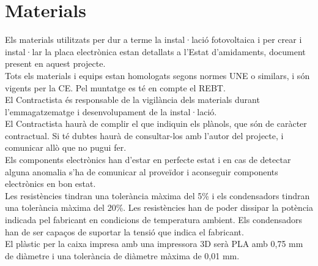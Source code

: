 \section{Materials}
Els materials utilitzats per dur a terme la instal·lació fotovoltaica i per crear i instal·lar la placa electrònica estan detallats a l'Estat d'amidaments, document present en aquest projecte.\\
\newline Tots els materials i equips estan homologats segons normes UNE o similars, i són vigents per la CE. Pel muntatge es té en compte el REBT.\\
\newline El Contractista és responsable de la vigilància dels materials durant l'emmagatzematge i desenvolupament de la instal·lació.\\
\newline El Contractista haurà de complir el que indiquin els plànols, que són de caràcter contractual. Si té dubtes haurà de consultar-los amb l'autor del projecte, i comunicar allò que no pugui fer.\\
\newline Els components electrònics han d'estar en perfecte estat i en cas de detectar alguna anomalia s'ha de comunicar al proveïdor i aconseguir components electrònics en bon estat.\\
\newline Les resistències tindran una tolerància màxima del 5\% i els condensadors tindran una tolerància màxima del 20\%. Les resistències han de poder dissipar la potència indicada pel fabricant en condicions de temperatura ambient. Els condensadors han de ser capaços de suportar la tensió que indica el fabricant.\\
\newline El plàstic per la caixa impresa amb una impressora 3D serà PLA amb 0,75 mm de diàmetre i una tolerància de diàmetre màxima de 0,01 mm.

